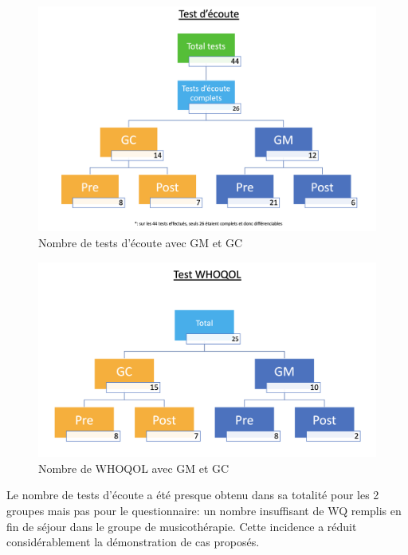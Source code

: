 \begin{figure}
	\centering
	\includegraphics[width=1\linewidth]{images/graphiques/Testecoute.png}
	\caption{Nombre de tests d'écoute avec GM et GC}
	
\end{figure}



\begin{figure}
	\centering
	\includegraphics[width=1\linewidth]{images/graphiques/TestWQ.png}
	\caption{Nombre de WHOQOL avec GM et GC}
\end{figure}






    
     
     Le nombre de tests d'écoute a été presque obtenu dans sa totalité pour les 2 groupes mais 
     pas 
     pour le questionnaire: un nombre insuffisant  de WQ remplis en fin de 
     séjour dans le groupe de musicothérapie.
     Cette  incidence a réduit considérablement la démonstration de cas proposés.
     
